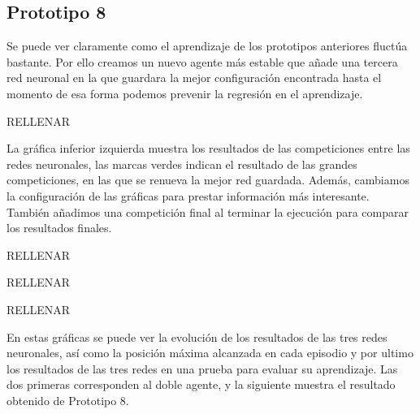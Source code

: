 \subsection{Prototipo 8}
Se puede ver claramente como el aprendizaje de los prototipos anteriores fluctúa bastante. Por ello creamos un nuevo agente más estable que añade una tercera red neuronal en la que guardara la mejor configuración encontrada hasta el momento de esa forma podemos prevenir la regresión en el aprendizaje.

%
{RELLENAR}

La gráfica inferior izquierda muestra los resultados de las competiciones entre las redes neuronales, las marcas verdes indican el resultado de las grandes competiciones, en las que se renueva la mejor red guardada.
Además, cambiamos la configuración de las gráficas para prestar información más interesante.
También añadimos una competición final al terminar la ejecución para comparar los resultados finales.

%
{RELLENAR}

%
{RELLENAR}

%
{RELLENAR}

En estas gráficas se puede ver la evolución de los resultados de las tres redes neuronales, así como la posición máxima alcanzada en cada episodio y por ultimo los resultados de las tres redes en una prueba para evaluar su aprendizaje.
Las dos primeras corresponden al doble agente, y la siguiente muestra el resultado obtenido de Prototipo 8.



